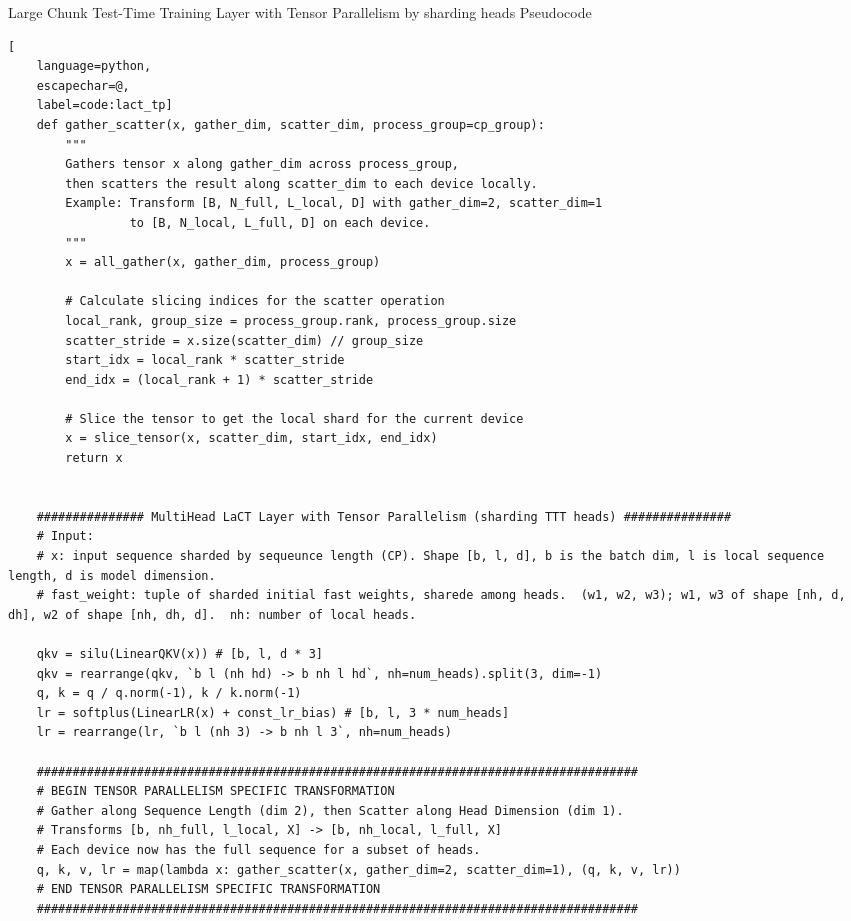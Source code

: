 \begin{algorithm}[h]
\caption{Large Chunk Test-Time Training Layer with Tensor Parallelism by sharding heads Pseudocode}\label{alg:lact_tp}
\newcommand{\hlbox}[1]{%
  \fboxsep=1.2pt\hspace*{-\fboxsep}\colorbox{blue!10}{\detokenize{#1}}%
}
\lstset{style=mocov3}
\begin{lstlisting}[
    language=python,
    escapechar=@,
    label=code:lact_tp]
    def gather_scatter(x, gather_dim, scatter_dim, process_group=cp_group):
        """
        Gathers tensor x along gather_dim across process_group,
        then scatters the result along scatter_dim to each device locally.
        Example: Transform [B, N_full, L_local, D] with gather_dim=2, scatter_dim=1
                 to [B, N_local, L_full, D] on each device.
        """
        x = all_gather(x, gather_dim, process_group)

        # Calculate slicing indices for the scatter operation
        local_rank, group_size = process_group.rank, process_group.size
        scatter_stride = x.size(scatter_dim) // group_size
        start_idx = local_rank * scatter_stride
        end_idx = (local_rank + 1) * scatter_stride

        # Slice the tensor to get the local shard for the current device
        x = slice_tensor(x, scatter_dim, start_idx, end_idx)
        return x

        
    ############### MultiHead LaCT Layer with Tensor Parallelism (sharding TTT heads) ###############
    # Input: 
    # x: input sequence sharded by sequeunce length (CP). Shape [b, l, d], b is the batch dim, l is local sequence length, d is model dimension. 
    # fast_weight: tuple of sharded initial fast weights, sharede among heads.  (w1, w2, w3); w1, w3 of shape [nh, d, dh], w2 of shape [nh, dh, d].  nh: number of local heads. 

    qkv = silu(LinearQKV(x)) # [b, l, d * 3]
    qkv = rearrange(qkv, `b l (nh hd) -> b nh l hd`, nh=num_heads).split(3, dim=-1)
    q, k = q / q.norm(-1), k / k.norm(-1)
    lr = softplus(LinearLR(x) + const_lr_bias) # [b, l, 3 * num_heads]
    lr = rearrange(lr, `b l (nh 3) -> b nh l 3`, nh=num_heads)

    ####################################################################################
    # BEGIN TENSOR PARALLELISM SPECIFIC TRANSFORMATION 
    # Gather along Sequence Length (dim 2), then Scatter along Head Dimension (dim 1).
    # Transforms [b, nh_full, l_local, X] -> [b, nh_local, l_full, X]
    # Each device now has the full sequence for a subset of heads.
    q, k, v, lr = map(lambda x: gather_scatter(x, gather_dim=2, scatter_dim=1), (q, k, v, lr))
    # END TENSOR PARALLELISM SPECIFIC TRANSFORMATION
    ####################################################################################


\end{lstlisting}
\end{algorithm}
